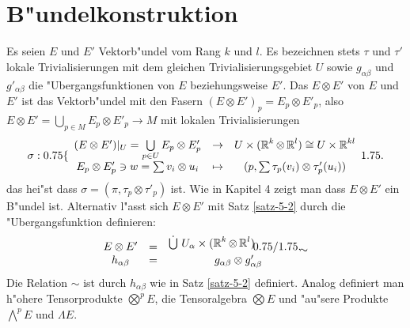 \section{B"undelkonstruktion}

Es seien $E$ und $E'$ Vektorb"undel vom Rang $k$ und $l$.
Es bezeichnen stets $\tau$ und $\tau'$ lokale Trivialisierungen mit dem gleichen Trivialisierungsgebiet $U$ sowie $g_{\alpha\beta}$ und $g'_{\alpha\beta}$ die "Ubergangsfunktionen von $E$ beziehungsweise $E'$.
Das  $E \otimes E'$ von $E$ und $E'$ ist das Vektorb"undel mit den Fasern $(E \otimes E')_p = E_p \otimes E'_p$, also $E \otimes E' = \bigcup_{p \in M} E_p \otimes E'_p \to M$ mit lokalen Trivialisierungen
	\[ \sigma: 0.75\{\begin{array}{ccc} (E \otimes E')|_U = \bigcup\limits_{p \in U} E_p \otimes E'_p &\to& U \times (\operatorname{\mathbb{R}}^k \otimes \operatorname{\mathbb{R}}^l) \cong U \times \operatorname{\mathbb{R}}^{kl} \\
		E_p \otimes E'_p \ni w = \sum v_i \otimes u_i &\mapsto& (p, \sum \tau_p(v_i) \otimes \tau'_p(u_i)) \end{array}1.75. \]
das hei"st dass $\sigma = (\pi, \tau_p \otimes \tau'_p)$ ist.
Wie in Kapitel 4 zeigt man dass $E \otimes E'$ ein B"undel ist.
Alternativ l"asst sich $E \otimes E'$ mit Satz \ref{satz-5-2} durch die "Ubergangsfunktion definieren:
	\[\begin{array}{ccc} E \otimes E' &=& \FakRaum{\dot \bigcup \ U_{\alpha} \X (\R^k \otimes \R^l)}{\sim} \\
		h_{\alpha\beta} &=& g_{\alpha\beta} \otimes g'_{\alpha\beta} \end{array}\]
Die Relation $\sim$ ist durch $h_{\alpha\beta}$ wie in Satz \ref{satz-5-2} definiert.
Analog definiert man h"ohere Tensorprodukte $\bigotimes^pE$, die Tensoralgebra $\bigotimes E$ und "au"sere Produkte $\bigwedge^pE$ und $\Lambda E$.

